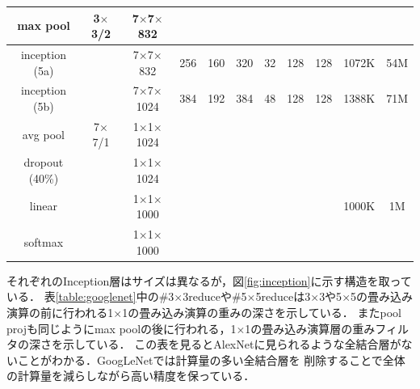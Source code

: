{\begin{table}[p]
\begin{center}
{\begin{tabular}{|c|c|c|c|c|c|c|c|c|c|c|}
  max pool       & 3$\times$3/2 & 7$\times$7$\times$832 &  &  &  &  &  &  &  &  \\ \hline
  inception (5a) &  & 7$\times$7$\times$832 & 256 & 160 & 320 & 32 & 128 & 128 & 1072K & 54M \\ \hline
  inception (5b) &  & 7$\times$7$\times$1024 & 384 & 192 & 384 & 48 & 128 & 128 & 1388K & 71M \\ \hline
  avg pool       & 7$\times$7/1 & 1$\times$1$\times$1024 &  &  &  &  &  &  &  &  \\ \hline
  dropout (40\%) &  & 1$\times$1$\times$1024 &  &  &  &  &  &  &  &  \\ \hline
  linear         &  & 1$\times$1$\times$1000 &  &  &  &  &  &  & 1000K & 1M \\ \hline
  softmax        &  & 1$\times$1$\times$1000 &  &  &  &  &  &  &  &  \\ \hline
  \end{tabular}
  }
  \end{center}
\end{table}

それぞれのInception層はサイズは異なるが，図\ref{fig:inception}に示す構造を取っている．
表\ref{table:googlenet}中の\#3$\times$3reduceや\#5$\times$5reduceは3$\times$3や5$\times$5の畳み込み演算の前に行われる1$\times$1の畳み込み演算の重みの深さを示している．
またpool projも同じようにmax poolの後に行われる，1$\times$1の畳み込み演算層の重みフィルタの深さを示している．
この表を見るとAlexNetに見られるような全結合層がないことがわかる．GoogLeNetでは計算量の多い全結合層を
削除することで全体の計算量を減らしながら高い精度を保っている．
}
